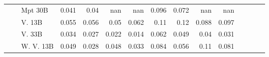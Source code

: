 \begin{table}[!htbp]
\begin{tabular}{l|l|l|rrrr|rrrr|rrrr}
  &  & Mpt 30B   & {\cellcolor[HTML]{D4E4F4}} \color[HTML]{000000} 0.041 & {\cellcolor[HTML]{D6E5F4}} \color[HTML]{000000} 0.04 & {\cellcolor[HTML]{000000}} \color[HTML]{F1F1F1} nan & {\cellcolor[HTML]{000000}} \color[HTML]{F1F1F1} nan & {\cellcolor[HTML]{FCBBA1}} \color[HTML]{000000} 0.096 & {\cellcolor[HTML]{FDD5C4}} \color[HTML]{000000} 0.072 & {\cellcolor[HTML]{000000}} \color[HTML]{F1F1F1} nan & {\cellcolor[HTML]{000000}} \color[HTML]{F1F1F1} nan \\
  &  & V. 13B  & {\cellcolor[HTML]{C1D9ED}} \color[HTML]{000000} 0.055 & {\cellcolor[HTML]{BDD7EC}} \color[HTML]{000000} 0.056 & {\cellcolor[HTML]{C9DDF0}} \color[HTML]{000000} 0.05 & {\cellcolor[HTML]{B0D2E7}} \color[HTML]{000000} 0.062 & {\cellcolor[HTML]{FCAA8D}} \color[HTML]{000000} 0.11 & {\cellcolor[HTML]{FCA183}} \color[HTML]{000000} 0.12 & {\cellcolor[HTML]{FCC4AD}} \color[HTML]{000000} 0.088 & {\cellcolor[HTML]{FCB99F}} \color[HTML]{000000} 0.097 \\
  &  & V. 33B  & {\cellcolor[HTML]{DDEAF7}} \color[HTML]{000000} 0.034 & {\cellcolor[HTML]{E7F0FA}} \color[HTML]{000000} 0.027 & {\cellcolor[HTML]{EEF5FC}} \color[HTML]{000000} 0.022 & {\cellcolor[HTML]{F7FBFF}} \color[HTML]{000000} 0.014 & {\cellcolor[HTML]{FEE1D4}} \color[HTML]{000000} 0.062 & {\cellcolor[HTML]{FEE9DF}} \color[HTML]{000000} 0.049 & {\cellcolor[HTML]{FFF0E8}} \color[HTML]{000000} 0.04 & {\cellcolor[HTML]{FFF5F0}} \color[HTML]{000000} 0.031 \\
  &  & W. V. 13B  & {\cellcolor[HTML]{CADEF0}} \color[HTML]{000000} 0.049 & {\cellcolor[HTML]{E6F0F9}} \color[HTML]{000000} 0.028 & {\cellcolor[HTML]{CCDFF1}} \color[HTML]{000000} 0.048 & {\cellcolor[HTML]{DFEBF7}} \color[HTML]{000000} 0.033 & {\cellcolor[HTML]{FDC9B3}} \color[HTML]{000000} 0.084 & {\cellcolor[HTML]{FEE5D8}} \color[HTML]{000000} 0.056 & {\cellcolor[HTML]{FCAA8D}} \color[HTML]{000000} 0.11 & {\cellcolor[HTML]{FDCBB6}} \color[HTML]{000000} 0.081 \\

\bottomrule

\end{tabular}
\setlength{\tabcolsep}{6pt}
\end{table}
